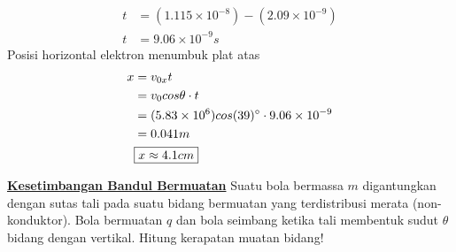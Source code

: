 \begin{enumerate}
    \begin{align*}
        t&=(1.115\times10^{-8})- (2.09\times10^{-9})\\
        t&=9.06\times10^{-9}s
    \end{align*}
    Posisi horizontal elektron menumbuk plat atas
    \begin{align*}
        x&=v_{0x}t\\
        &=v_{0}cos\theta\cdot t\\
        &=(5.83\times 10^{6})cos(39)^{\circ}\cdot 9.06\times10^{-9}\\
        &=0.041m\\
        &\fbox{$x\approx4.1cm$}
    \end{align*}


    \begin{minipage}{0.6\textwidth}
    \item \underline{\textbf{Kesetimbangan Bandul Bermuatan}}
    \vskip5pt
    Suatu bola bermassa $m$ digantungkan dengan sutas tali pada suatu bidang bermuatan yang terdistribusi merata (non-konduktor). Bola bermuatan $q$ dan bola seimbang ketika tali membentuk sudut $\theta$ bidang dengan vertikal. Hitung kerapatan muatan bidang!
    \end{minipage}
    \hfill
    \begin{minipage}{0.25\textwidth}
    \end{minipage}

    \begin{center}
    \end{center}


\end{enumerate}
